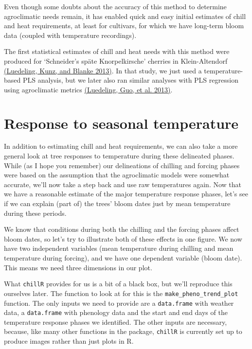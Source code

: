 \documentclass[
]{book}
\begin{document}
Even though some doubts about the accuracy of this method to determine agroclimatic needs remain, it has enabled quick and easy initial estimates of chill and heat requirements, at least for cultivars, for which we have long-term bloom data (coupled with temperature recordings).

The first statistical estimates of chill and heat needs with this method were produced for `Schneider's späte Knorpelkirsche' cherries in Klein-Altendorf \href{https://link.springer.com/article/10.1007/s00484-012-0594-y}{(Luedeling, Kunz, and Blanke \protect\hyperlink{ref-luedeling2013identification}{2013})}. In that study, we just used a temperature-based PLS analysis, but we later also ran similar analyses with PLS regression using agroclimatic metrics \href{https://www.sciencedirect.com/science/article/pii/S0168192313001780}{(Luedeling, Guo, et al. \protect\hyperlink{ref-luedeling2013differential}{2013})}.

\hypertarget{response-to-seasonal-temperature}{%
\section{Response to seasonal temperature}\label{response-to-seasonal-temperature}}

In addition to estimating chill and heat requirements, we can also take a more general look at tree responses to temperature during these delineated phases. While (as I hope you remember) our delineations of chilling and forcing phases were based on the assumption that the agroclimatic models were somewhat accurate, we'll now take a step back and use raw temperatures again. Now that we have a reasonable estimate of the major temperature response phases, let's see if we can explain (part of) the trees' bloom dates just by mean temperature during these periods.

We know that conditions during both the chilling and the forcing phases affect bloom dates, so let's try to illustrate both of these effects in one figure. We now have two independent variables (mean temperature during chilling and mean temperature during forcing), and we have one dependent variable (bloom date). This means we need three dimensions in our plot.

What \texttt{chillR} provides for us is a bit of a black box, but we'll reproduce this ourselves later. The function to look at for this is the \texttt{make\_pheno\_trend\_plot} function. The only inputs we need to provide are a \texttt{data.frame} with weather data, a \texttt{data.frame} with phenology data and the start and end days of the temperature response phases we identified. The other inputs are necessary, because, like many other functions in the package, \texttt{chillR} is currently set up to produce images rather than just plots in R.
\end{document}
